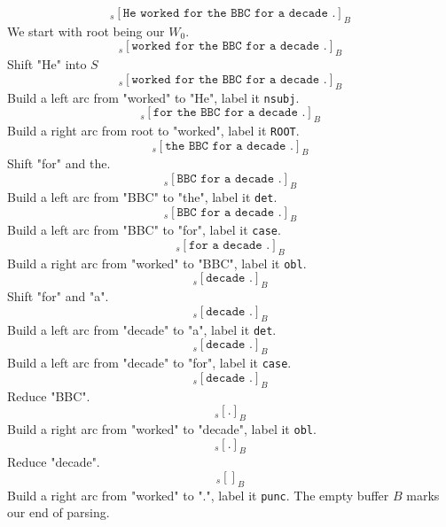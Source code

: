 \documentclass[11pt]{article} %
\begin{document}
\begin{equation}
  [\texttt{ROOT}]_s [\texttt{He worked for the BBC for a decade .}]_B
\end{equation}
We start with root being our $W_0$.
\begin{equation}
  [\texttt{ROOT He}]_s [\texttt{worked for the BBC for a decade .}]_B
\end{equation}
Shift "He" into $S$
\begin{equation}
  [\texttt{ROOT}]_s [\texttt{worked for the BBC for a decade .}]_B
\end{equation}
Build a left arc from "worked" to "He", label it \texttt{nsubj}.
\begin{equation}
  [\texttt{ROOT worked}]_s [\texttt{for the BBC for a decade .}]_B
\end{equation}
Build a right arc from root to "worked", label it \texttt{ROOT}.
\begin{equation}
  [\texttt{ROOT worked for the}]_s [\texttt{the BBC for a decade .}]_B
\end{equation}
Shift "for" and the.
\begin{equation}
  [\texttt{ROOT worked for}]_s [\texttt{BBC for a decade .}]_B
\end{equation}
Build a left arc from "BBC" to "the", label it \texttt{det}.
\begin{equation}
  [\texttt{ROOT worked}]_s [\texttt{BBC for a decade .}]_B
\end{equation}
Build a left arc from "BBC" to "for", label it \texttt{case}.
\begin{equation}
  [\texttt{ROOT worked BBC}]_s [\texttt{for a decade .}]_B
\end{equation}
Build a right arc from "worked" to "BBC", label it \texttt{obl}.
\begin{equation}
  [\texttt{ROOT worked BBC for a}]_s [\texttt{decade .}]_B
\end{equation}
Shift "for" and "a".
\begin{equation}
  [\texttt{ROOT worked BBC for}]_s [\texttt{decade .}]_B
\end{equation}
Build a left arc from "decade" to "a", label it \texttt{det}.
\begin{equation}
  [\texttt{ROOT worked BBC}]_s [\texttt{decade .}]_B
\end{equation}
Build a left arc from "decade" to "for", label it \texttt{case}.
\begin{equation}
  [\texttt{ROOT worked}]_s [\texttt{decade .}]_B
\end{equation}
Reduce "BBC".
\begin{equation}
  [\texttt{ROOT worked decade}]_s [\texttt{.}]_B
\end{equation}
Build a right arc from "worked" to "decade", label it \texttt{obl}.
\begin{equation}
  [\texttt{ROOT worked}]_s [\texttt{.}]_B
\end{equation}
Reduce "decade".
\begin{equation}
  [\texttt{ROOT worked .}]_s []_B
\end{equation}
Build a right arc from "worked" to ".", label it \texttt{punc}. The empty buffer $B$ marks our end of parsing.

\printbibliography
\end{document}
